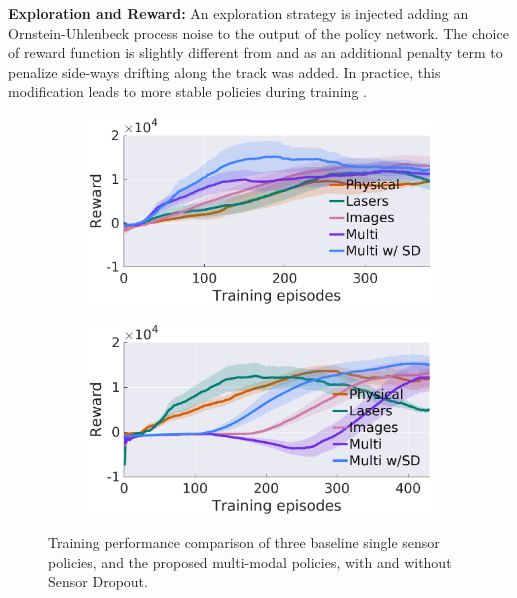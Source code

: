 \documentclass[../thesis.tex]{subfiles}
\begin{document}
\textbf{Exploration and Reward:} %
An exploration strategy is injected adding an Ornstein-Uhlenbeck process noise \cite{uhlenbeck1930theory} to the output of the policy network. 
The choice of reward function is slightly different from  \citet{DBLP:journals/corr/LillicrapHPHETS15} and \citet{A3C} as an additional penalty term to penalize side-ways drifting along the track was added. In practice, this modification leads to more stable policies during training \cite{BenLau16}. %

\begin{figure}[t]
	\centering
	\begin{subfigure}[b]{0.4\linewidth}
		\includegraphics[width=0.9\columnwidth]{./MultimodalDRL/fig/training_exp_naf}
		\label{fig:training_exp_naf}
	\end{subfigure}
	\begin{subfigure}[b]{0.4\linewidth}
		\includegraphics[width=0.9\columnwidth]{./MultimodalDRL/fig/training_exp_ddpg}
		\label{fig:training_exp_ddpg}
	\end{subfigure}
	\caption{Training performance comparison of three baseline single sensor policies, and the proposed multi-modal policies, with and without Sensor Dropout.}
	\label{fig:training_exp}
\end{figure}
\end{document}
